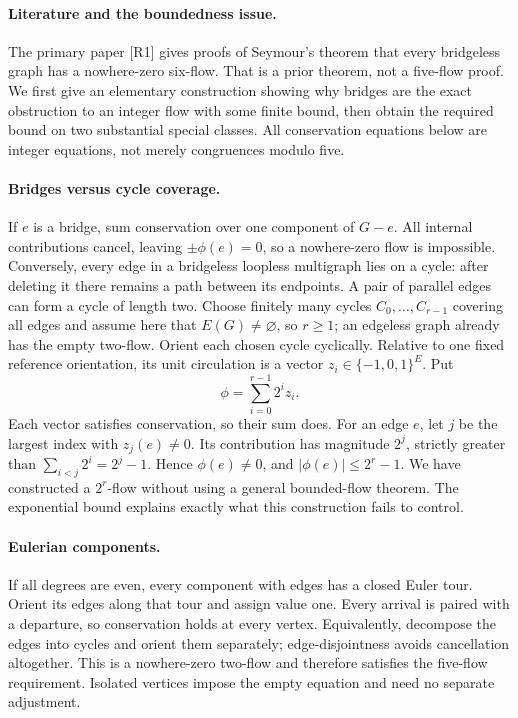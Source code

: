 \documentclass[11pt,a4paper]{article}
\begin{document}
\paragraph{Literature and the boundedness issue.}
The primary paper [R1] gives proofs of Seymour's theorem that every
bridgeless graph has a nowhere-zero six-flow. That is a prior theorem,
not a five-flow proof. We first give an elementary construction showing
why bridges are the exact obstruction to an integer flow with some finite
bound, then obtain the required bound on two substantial special classes.
All conservation equations below are integer equations, not merely
congruences modulo five.

\paragraph{Bridges versus cycle coverage.}
If $e$ is a bridge, sum conservation over one component of $G-e$.
All internal contributions cancel, leaving $\pm\phi(e)=0$, so a nowhere-zero
flow is impossible. Conversely, every edge in a bridgeless loopless
multigraph lies on a cycle: after deleting it there remains a path between
its endpoints. A pair of parallel edges can form a cycle of length two.
Choose finitely many cycles $C_0,\ldots,C_{r-1}$ covering all edges and
assume here that $E(G)\ne\varnothing$, so $r\ge1$; an edgeless graph
already has the empty two-flow. Orient each chosen cycle cyclically.
Relative to one fixed reference orientation, its
unit circulation is a vector $z_i\in\{-1,0,1\}^{E}$.
Put
\[
             \phi=\sum_{i=0}^{r-1}2^i z_i.
\]
Each vector satisfies conservation, so their sum does. For an edge $e$,
let $j$ be the largest index with $z_j(e)\ne0$. Its contribution has
magnitude $2^j$, strictly greater than
$\sum_{i<j}2^i=2^j-1$. Hence $\phi(e)\ne0$, and
$|\phi(e)|\le2^r-1$. We have constructed a $2^r$-flow without using a
general bounded-flow theorem. The exponential bound explains exactly what
this construction fails to control.

\paragraph{Eulerian components.}
If all degrees are even, every component with edges has a closed Euler
tour. Orient its edges along that tour and assign value one. Every arrival
is paired with a departure, so conservation holds at every vertex.
Equivalently, decompose the edges into cycles and orient them separately;
edge-disjointness avoids cancellation altogether. This is a nowhere-zero
two-flow and therefore satisfies the five-flow requirement. Isolated
vertices impose the empty equation and need no separate adjustment.
\end{document}
